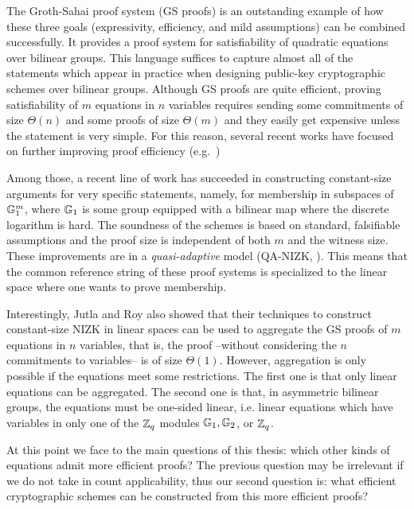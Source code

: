 The Groth-Sahai proof system (GS proofs) \cite{SIAMJC:GroSah12} 
  is an outstanding example of how these three goals (expressivity, 
  efficiency, and mild assumptions) can be combined successfully.  
It provides a proof system for satisfiability of quadratic equations over 
  bilinear groups. This language suffices to capture almost all of the 
  statements which appear 
  in practice when designing public-key cryptographic schemes over bilinear groups.  
Although GS proofs are quite efficient, proving satisfiability of $m$ equations in $n$ variables requires 
sending some commitments of size $\Theta(n)$ and some proofs of size $\Theta(m)$ and they 
easily get expensive unless the statement is very simple. For this reason, several recent works 
 have focused on further improving proof efficiency 
 (e.g.\ \cite{PKC:EscGro14,C:EHKRV13,TCC:Rafols15})

Among those, a recent line of work 
  \cite{AC:JutRoy13,C:JutRoy14,EC:KilWee15,EC:LPJY14} 
has succeeded in constructing constant-size  
  arguments for very specific statements, namely, for membership in subspaces of $\mathbb{G}_1^{m}$, 
  where $\mathbb{G}_1$ is some group equipped with a bilinear map where the discrete logarithm is hard. 
The soundness of the schemes is based on standard, falsifiable assumptions 
  and the proof size is independent of both $m$ and the witness size.  These improvements are in a  \textit{quasi-adaptive} 
  model (QA-NIZK, \cite{AC:JutRoy13}).  This means that the common reference string of these proof systems is 
  specialized to the linear space where one wants to prove membership.
  
Interestingly, Jutla and Roy  \cite{C:JutRoy14} also showed that their techniques to construct 
  constant-size NIZK in linear spaces can be used to aggregate the GS proofs of $m$ equations in $n$ variables, that is, the proof --without considering the $n$ commitments to variables-- is of size $\Theta(1)$. However, aggregation is only possible if the equations meet some restrictions. The first one is that only linear equations can be aggregated. The second one is that, in asymmetric bilinear groups, the equations must be one-sided linear, i.e. linear equations 
  which have variables in only one of the $\mathbb{Z}_q$ modules $\mathbb{G}_1,\mathbb{G}_2$, 
  or $\mathbb{Z}_q$.

At this point we face to the main questions of this thesis: which other kinds of equations admit more efficient proofs? The previous question may be irrelevant if we do not take in count applicability, thus our second question is: what efficient cryptographic schemes can be constructed from this more efficient proofs?

